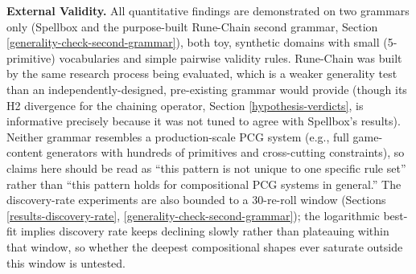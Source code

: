 \documentclass[]{article}
\begin{document}
        \textbf{External Validity.} All quantitative findings are demonstrated on two grammars only (Spellbox and the purpose-built Rune-Chain second grammar, Section \ref{generality-check-second-grammar}), both toy, synthetic domains with small (5-primitive) vocabularies and simple pairwise validity rules. Rune-Chain was built by the same research process being evaluated, which is a weaker generality test than an independently-designed, pre-existing grammar would provide (though its H2 divergence for the chaining operator, Section \ref{hypothesis-verdicts}, is informative precisely because it was not tuned to agree with Spellbox's results). Neither grammar resembles a production-scale PCG system (e.g., full game-content generators with hundreds of primitives and cross-cutting constraints), so claims here should be read as ``this pattern is not unique to one specific rule set'' rather than ``this pattern holds for compositional PCG systems in general.'' The discovery-rate experiments are also bounded to a 30-re-roll window (Sections \ref{results-discovery-rate}, \ref{generality-check-second-grammar}); the logarithmic best-fit implies discovery rate keeps declining slowly rather than plateauing within that window, so whether the deepest compositional shapes ever saturate outside this window is untested.
        
\end{document}
